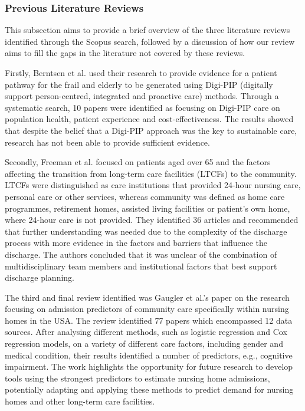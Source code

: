 \documentclass[../thesis.tex]{subfiles}
\begin{document}
\subsubsection{Previous Literature Reviews}\label{subsection:pr}
This subsection aims to provide a brief overview of the three literature reviews identified through the Scopus search, followed by a discussion of how our review aims to fill the gaps in the literature not covered by these reviews.

Firstly, Berntsen et al. \cite{Berntsen} used their research to provide evidence for a patient pathway for the frail and elderly to be generated using Digi-PIP (digitally support person-centred, integrated and proactive care) methods. Through a systematic search, 10 papers were identified as focusing on Digi-PIP care on population health, patient experience and cost-effectiveness. The results showed that despite the belief that a Digi-PIP approach was the key to sustainable care, research has not been able to provide sufficient evidence.

Secondly, Freeman et al. \cite{Freeman} focused on patients aged over 65 and the factors affecting the transition from long-term care facilities (LTCFs) to the community. LTCFs were distinguished as care institutions that provided 24-hour nursing care, personal care or other services, whereas community was defined as home care programmes, retirement homes, assisted living facilities or patient's own home, where 24-hour care is not provided. They identified 36 articles and recommended that further understanding was needed due to the complexity of the discharge process with more evidence in the factors and barriers that influence the discharge. The authors concluded that it was unclear of the combination of multidisciplinary team members and institutional factors that best support discharge planning.

The third and final review identified was Gaugler et al.'s \cite{Gaugler} paper on the research focusing on admission predictors of community care specifically within nursing homes in the USA. The review identified 77 papers which encompassed 12 data sources. After analysing different methods, such as logistic regression and Cox regression models, on a variety of different care factors, including gender and medical condition, their results identified a number of predictors, e.g., cognitive impairment. The work highlights the opportunity for future research to develop tools using the strongest predictors to estimate nursing home admissions, potentially adapting and applying these methods to predict demand for nursing homes and other long-term care facilities.
\end{document}
